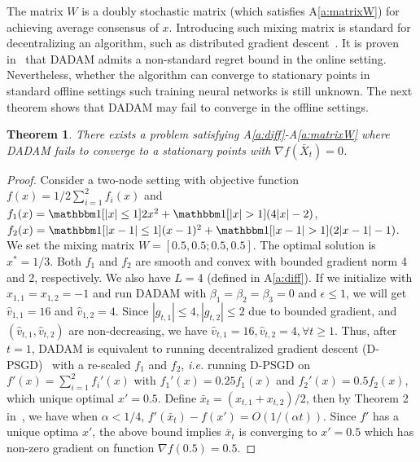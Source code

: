 \documentclass[11pt]{article}
\newtheorem{theorem}{Theorem}
\begin{document}
The matrix $W$ is a doubly stochastic matrix (which satisfies A\ref{a:matrixW}) for achieving  average consensus of $x$. 
Introducing such mixing matrix is standard for decentralizing an algorithm, such as distributed gradient descent~\citep{nedic2009distributed, yuan2016convergence}. 
It is proven in~\cite{nazari2019dadam} that DADAM admits a non-standard regret bound in the online setting. Nevertheless, whether the algorithm can converge to stationary points in standard offline settings such training neural networks is still unknown.
The next theorem shows that DADAM may fail to converge in the offline  settings.




\begin{theorem}\label{thm: dadam_diverge}
There exists a problem satisfying A\ref{a:diff}-A\ref{a:matrixW} where DADAM fails to converge to a stationary points with $\nabla f(\bar X_t) = 0$.   
\end{theorem}



\begin{proof}
Consider a two-node setting with objective function $f(x) =1/2 \sum_{i=1}^2 f_i(x)$ and $f_1(x) =  \mathbbm 1[|x|\leq 1] 2x^2 +  \mathbbm 1[|x|> 1] (4|x|-2)$, $f_2(x) =  \mathbbm 1[|x-1|\leq 1](x-1)^2 + \mathbbm 1[|x-1| > 1] (2|x-1|-1)$. We set the mixing matrix  $W = [0.5,0.5;0.5,0.5]$. The optimal solution is $x^* = 1/3$.
Both $f_1$ and $f_2$ are smooth and convex with bounded gradient norm 4 and 2, respectively. 
We also have $L = 4$ (defined in A\ref{a:diff}). 
If we initialize with $x_{1,1} = x_{1,2} = -1$ and run DADAM with $\beta_1 = \beta_2 =\beta_3 = 0$ and $\epsilon \leq 1$, we will get $\hat v_{1,1} = 16$ and $\hat v_{1,2} = 4$. 
Since $|g_{t,1}| \leq 4, |g_{t,2}| \leq 2$ due to bounded gradient, and $(\hat v_{t,1},\hat v_{t,2})$ are non-decreasing, we have $\hat v_{t,1} = 16, \hat v_{t,2}=4, \forall t \geq 1$. 
Thus, after $t=1$, DADAM is equivalent to running decentralized gradient descent (D-PSGD)~\citep{yuan2016convergence} with a re-scaled $f_1$ and $f_2$, \textit{i.e.} running D-PSGD on
$f'(x) = \sum_{i=1}^2 f_i'(x)$ with $f_1'(x) =  0.25 f_1(x)$ and $f_2'(x) = 0.5  f_2(x)$, which unique optimal $x'=0.5$. 
Define $\bar x_t = (x_{t,1}+x_{t,2})/2$, then by Theorem 2 in~\cite{yuan2016convergence}, we have when $\alpha < 1/4$, $f'(\bar x_t) - f(x') = O(1/(\alpha t))$. 
Since $f'$ has a unique optima $x'$, the above bound implies $\bar x_t$ is converging to $x'=0.5$ which has non-zero gradient on function $\nabla f(0.5) = 0.5$.
\end{proof}
\end{document}

